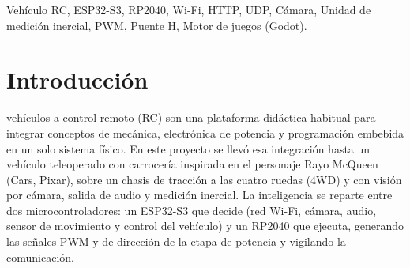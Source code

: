 \documentclass[journal]{IEEEtran}
\begin{document}
\renewcommand{\abstractname}{Abstract}
\begin{abstract}
This work presents the design and implementation of a radio-controlled vehicle inspired by the character Lightning McQueen, built on a four-wheel-drive (4WD) chassis with four DC gearmotors and two TB6612FNG H-bridge drivers. The project focuses on integrating electronic and multimedia components into the vehicle and on connecting it to a game engine. Control is split between two microcontrollers: an ESP32-S3 acting as the brain (Wi-Fi network, camera, audio, motion sensor and vehicle control) and an RP2040 acting as the body (generation of the PWM and direction signals, with a communication watchdog). The document describes the power supply of the modules, the communication protocol between both boards and the two user interfaces: a web page served by the vehicle itself and a desktop and mobile application built on the Godot game engine, which receives video and attitude in real time over UDP and commands the motors, lights and audio over HTTP. Every subsystem is validated experimentally and with automated tests of the link, contrasted with a quantitative analysis of the mechanical and electrical magnitudes. The integration of the sensors, the multimedia elements and the control application was completed and verified on the prototype.
\end{abstract}

\begin{IEEEkeywords}
Vehículo RC, ESP32-S3, RP2040, Wi-Fi, HTTP, UDP, Cámara, Unidad de medición inercial, PWM, Puente H, Motor de juegos (Godot).
\end{IEEEkeywords}



\section{Introducción}

 vehículos a control remoto (RC) son una plataforma didáctica habitual para integrar conceptos de mecánica, electrónica de potencia y programación embebida en un solo sistema físico. En este proyecto se llevó esa integración hasta un vehículo teleoperado con carrocería inspirada en el personaje Rayo McQueen (Cars, Pixar), sobre un chasis de tracción a las cuatro ruedas (4WD) y con visión por cámara, salida de audio y medición inercial. La inteligencia se reparte entre dos microcontroladores: un ESP32-S3 que decide (red Wi-Fi, cámara, audio, sensor de movimiento y control del vehículo) y un RP2040 que ejecuta, generando las señales PWM y de dirección de la etapa de potencia y vigilando la comunicación.
\end{document}
